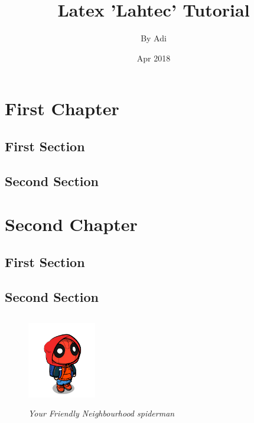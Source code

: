 \documentclass[a4paper,12pt,landscape,twocolumn]{book}
\begin{document}
	\title{\Large{Latex 'Lahtec' Tutorial}}
	\author{By Adi}
	\date{Apr 2018}
	\maketitle
	\let\cleardoublepage\clearpage %

	\tableofcontents
	\setcounter{page}{2}

	\pagestyle{fancy}
	\fancyhf{} %

	\rfoot{\thepage}

	\setlength{\headheight}{14.5pt}
	
	\chapter{First Chapter}
	\blindmathtrue
	\blindtext[5]
	\section{First Section}
	\blindtext[3]
	\section{Second Section}
	\blindtext[2]


	\chapter{Second Chapter}
	\blindmathtrue
	\blindtext[5]
	\section{First Section}
	\blindtext[3]
	\section{Second Section}
	\blindtext[2]

	\begin{figure}[ht]
		\centering
		\includegraphics[width=3cm,height=4cm]{spiderman.png}
		\caption{\itshape Your Friendly Neighbourhood spiderman}\label{fig:spiderman}
	\end{figure}
	\blindtext[5]
\end{document}
